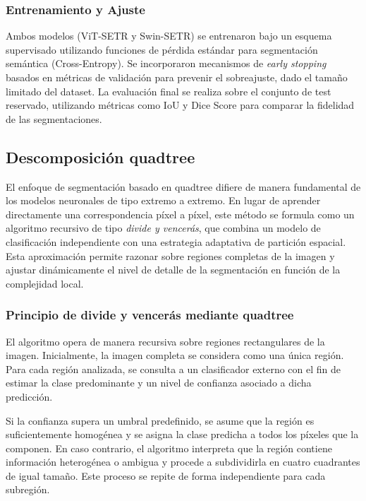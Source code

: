 \documentclass[onecolumn, 12pt , journal]{IEEEtran}
\begin{document}
\subsubsection{Entrenamiento y Ajuste}

Ambos modelos (ViT-SETR y Swin-SETR) se entrenaron bajo un esquema supervisado utilizando funciones de pérdida estándar para segmentación semántica (Cross-Entropy). Se incorporaron mecanismos de \emph{early stopping} basados en métricas de validación para prevenir el sobreajuste, dado el tamaño limitado del dataset. La evaluación final se realiza sobre el conjunto de test reservado, utilizando métricas como IoU y Dice Score para comparar la fidelidad de las segmentaciones.



\subsection{Descomposición quadtree}

El enfoque de segmentación basado en quadtree difiere de manera fundamental de los modelos neuronales de tipo extremo a extremo. En lugar de aprender directamente una correspondencia píxel a píxel, este método se formula como un algoritmo recursivo de tipo \emph{divide y vencerás}, que combina un modelo de clasificación independiente con una estrategia adaptativa de partición espacial. Esta aproximación permite razonar sobre regiones completas de la imagen y ajustar dinámicamente el nivel de detalle de la segmentación en función de la complejidad local.

\subsubsection{Principio de divide y vencerás mediante quadtree}

El algoritmo opera de manera recursiva sobre regiones rectangulares de la imagen. Inicialmente, la imagen completa se considera como una única región. Para cada región analizada, se consulta a un clasificador externo con el fin de estimar la clase predominante y un nivel de confianza asociado a dicha predicción.

Si la confianza supera un umbral predefinido, se asume que la región es suficientemente homogénea y se asigna la clase predicha a todos los píxeles que la componen. En caso contrario, el algoritmo interpreta que la región contiene información heterogénea o ambigua y procede a subdividirla en cuatro cuadrantes de igual tamaño. Este proceso se repite de forma independiente para cada subregión.
\end{document}
